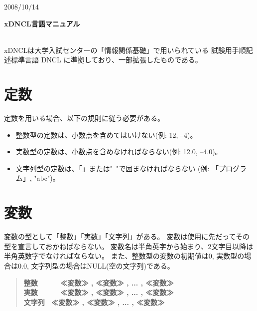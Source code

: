 \documentclass[11pt,a4j]{jarticle}
\begin{document}
\noindent
\begin{flushright}
{\small	2008/10/14}
\end{flushright}
\begin{center}
\begin{LARGE}
{\bf{xDNCL言語マニュアル }}\\
\ \\
\end{LARGE}
\end{center}

xDNCLは大学入試センターの「情報関係基礎」で用いられている
試験用手順記述標準言語 DNCL に準拠しており、一部拡張したものである。

\section{定数}
定数を用いる場合、以下の規則に従う必要がある。
\begin{itemize}
\itemsep 0pt  \parskip 0pt
\item	整数型の定数は、小数点を含めてはいけない(例: 12, --4)。
\item	実数型の定数は、小数点を含めなければならない(例: 12.0,  --4.0)。
\item	文字列型の定数は、「」または"\ "で囲まなければならない
        (例: 「プログラム」, "abc")。
\end{itemize}

\section{変数}
変数の型として「整数」「実数」「文字列」がある。
変数は使用に先だってその型を宣言しておかねばならない。
変数名は半角英字から始まり、2文字目以降は半角英数字でなければならない。
また、整数型の変数の初期値は0, 実数型の場合は0.0, 
文字列型の場合はNULL(空の文字列)である。
%
\begin{quotation}
{\bf{
\noindent 整数 \ \ \ \ \ ≪変数≫ , ≪変数≫ , ... , ≪変数≫ \\
実数 \ \ \ \ \ ≪変数≫ , ≪変数≫ , ... , ≪変数≫ \\
文字列 \ ≪変数≫ , ≪変数≫ , ... , ≪変数≫
}}
\end{quotation}
\end{document}
